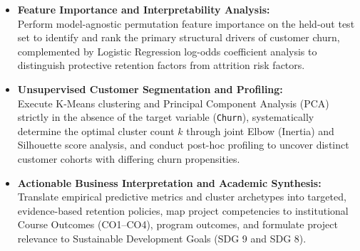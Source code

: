 \begin{itemize}
    \item[\textbf{Objective 4:}] \textbf{Feature Importance and Interpretability Analysis:}\\
    Perform model-agnostic permutation feature importance on the held-out test set to identify and rank the primary structural drivers of customer churn, complemented by Logistic Regression log-odds coefficient analysis to distinguish protective retention factors from attrition risk factors.

    \item[\textbf{Objective 5:}] \textbf{Unsupervised Customer Segmentation and Profiling:}\\
    Execute K-Means clustering and Principal Component Analysis (PCA) strictly in the absence of the target variable (\texttt{Churn}), systematically determine the optimal cluster count $k$ through joint Elbow (Inertia) and Silhouette score analysis, and conduct post-hoc profiling to uncover distinct customer cohorts with differing churn propensities.

    \item[\textbf{Objective 6:}] \textbf{Actionable Business Interpretation and Academic Synthesis:}\\
    Translate empirical predictive metrics and cluster archetypes into targeted, evidence-based retention policies, map project competencies to institutional Course Outcomes (CO1--CO4), program outcomes, and formulate project relevance to Sustainable Development Goals (SDG 9 and SDG 8).
\end{itemize}
